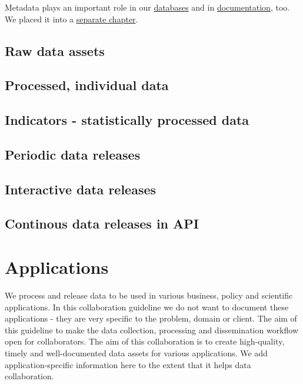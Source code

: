 \documentclass[
  fontsize=13pt,
  english,
  a4paper,
  openany, a4paper, oneside]{book}
\begin{document}
Metadata plays an important role in our \protect\hyperlink{data-storage}{databases} and in \protect\hyperlink{documentation}{documentation}, too. We placed it into a \protect\hyperlink{metadata}{separate chapter}.

\hypertarget{dta-raw}{%
\section{Raw data assets}\label{dta-raw}}

\hypertarget{processed-individual-data}{%
\section{Processed, individual data}\label{processed-individual-data}}

\hypertarget{indicators---statistically-processed-data}{%
\section{Indicators - statistically processed data}\label{indicators---statistically-processed-data}}

\hypertarget{periodic-data-releases}{%
\section{Periodic data releases}\label{periodic-data-releases}}

\hypertarget{interactive-data-releases}{%
\section{Interactive data releases}\label{interactive-data-releases}}

\hypertarget{continous-data-releases-in-api}{%
\section{Continous data releases in API}\label{continous-data-releases-in-api}}

\hypertarget{applications}{%
\chapter{Applications}\label{applications}}

We process and release data to be used in various business, policy and scientific applications. In this collaboration guideline we do not want to document these applications - they are very specific to the problem, domain or client. The aim of this guideline to make the data collection, processing and dissemination workflow open for collaborators. The aim of this collaboration is to create high-quality, timely and well-documented data assets for various applications. We add application-specific information here to the extent that it helps data collaboration.
\end{document}
